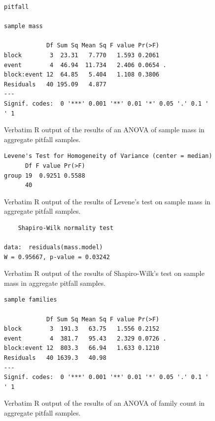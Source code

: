\documentclass[10pt,letterpaper,twocolumn]{article}
\begin{document}
\begin{figure}[h]
	\lstset{numbers=left}
	\lstset{xleftmargin=5mm,framexleftmargin=5mm}
	\begin{lstlisting}
pitfall 

sample mass 

            Df Sum Sq Mean Sq F value Pr(>F)  
block        3  23.31   7.770   1.593 0.2061  
event        4  46.94  11.734   2.406 0.0654 .
block:event 12  64.85   5.404   1.108 0.3806  
Residuals   40 195.09   4.877                 
---
Signif. codes:  0 '***' 0.001 '**' 0.01 '*' 0.05 '.' 0.1 ' ' 1
	\end{lstlisting}
	\caption{Verbatim R output of the results of an ANOVA of sample mass in aggregate pitfall samples.}
	\label{fig:bulk_pitfall_mass_anova}
	\smallskip
	\nointerlineskip
	\hrulefill
\end{figure}

\begin{figure}[h]
	\lstset{numbers=left}
	\lstset{xleftmargin=5mm,framexleftmargin=5mm}
	\begin{lstlisting}
Levene's Test for Homogeneity of Variance (center = median)
      Df F value Pr(>F)
group 19  0.9251 0.5588
      40               
	\end{lstlisting}
	\caption{Verbatim R output of the results of Levene's test on sample mass in aggregate pitfall samples.}
	\label{fig:bulk_pitfall_mass_levene}
	\smallskip
	\nointerlineskip
	\hrulefill
\end{figure}

\begin{figure}[h]
	\lstset{numbers=left}
	\lstset{xleftmargin=5mm,framexleftmargin=5mm}
	\begin{lstlisting}
	Shapiro-Wilk normality test

data:  residuals(mass.model)
W = 0.95667, p-value = 0.03242
	\end{lstlisting}
	\caption{Verbatim R output of the results of Shapiro-Wilk's test on sample mass in aggregate pitfall samples.}
	\label{fig:bulk_pitfall_mass_shapiro}
	\smallskip
	\nointerlineskip
	\hrulefill
\end{figure}

\begin{figure}[h]
	\lstset{numbers=left}
	\lstset{xleftmargin=5mm,framexleftmargin=5mm}
	\begin{lstlisting}
sample families 

            Df Sum Sq Mean Sq F value Pr(>F)  
block        3  191.3   63.75   1.556 0.2152  
event        4  381.7   95.43   2.329 0.0726 .
block:event 12  803.3   66.94   1.633 0.1210  
Residuals   40 1639.3   40.98                 
---
Signif. codes:  0 '***' 0.001 '**' 0.01 '*' 0.05 '.' 0.1 ' ' 1
	\end{lstlisting}
	\caption{Verbatim R output of the results of an ANOVA of family count in aggregate pitfall samples.}
	\label{fig:bulk_pitfall_family_anova}
	\smallskip
	\nointerlineskip
	\hrulefill
\end{figure}
\end{document}

